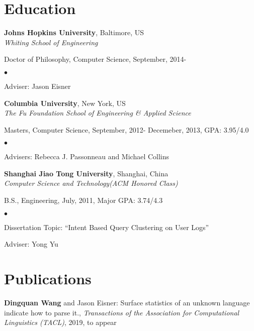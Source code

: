 \documentclass[margin,line]{res}
\newenvironment{list1}{
  \begin{list}{\ding{113}}{%
      \setlength{\itemsep}{0in}
      \setlength{\parsep}{0in} \setlength{\parskip}{0in}
      \setlength{\topsep}{0in} \setlength{\partopsep}{0in} 
      \setlength{\leftmargin}{0.17in}}}{\end{list}}
\newenvironment{list2}{
  \begin{list}{$\bullet$}{%
      \setlength{\itemsep}{0in}
      \setlength{\parsep}{0in} \setlength{\parskip}{0in}
      \setlength{\topsep}{0in} \setlength{\partopsep}{0in} 
      \setlength{\leftmargin}{0.2in}}}{\end{list}}
\begin{document}
\begin{resume}
\section{\sc Education}
{\bf Johns Hopkins University}, Baltimore, US\\
{\em Whiting School of Engineering} 
\begin{list1}
\item[] Doctor of Philosophy, Computer Science, September, 2014-\\
\begin{list2}
\vspace*{-4mm}
\item Adviser: Jason Eisner
\end{list2}
\end{list1}
\vspace*{-4mm}
{\bf Columbia University}, New York, US\\
{\em The Fu Foundation School of Engineering \& Applied Science} 
\begin{list1}
\item[] Masters, Computer Science, September, 2012- Decemeber, 2013, GPA: 3.95/4.0\\
\begin{list2}
\vspace*{-4mm}
\item Advisers: Rebecca J. Passonneau and Michael Collins 
\end{list2}
\end{list1}
\vspace*{-4mm}
{\bf Shanghai Jiao Tong University}, Shanghai, China\\
{\em Computer Science and Technology(ACM Honored Class)} 
\vspace*{-.0in}
\begin{list1}
\item[] B.S., Engineering, July, 2011, Major GPA: 3.74/4.3
\begin{list2}
\vspace*{.05in}
\item Dissertation Topic:  ``Intent Based Query Clustering on User Logs'' 
\item Adviser: Yong Yu 
\end{list2}
\end{list1}
\section{\sc Publications}
\textbf{Dingquan Wang} and Jason Eisner: Surface statistics of an unknown language indicate how to parse it., \emph{Transactions of the Association for Computational Linguistics (TACL)}, 2019, to appear


\end{resume}
\end{document}
